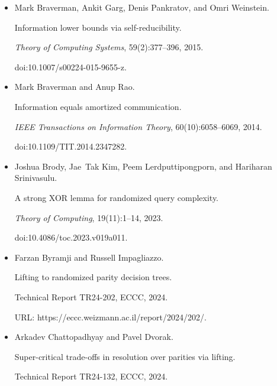 \begin{itemize}
doi:10.4230/LIPIcs.CCC.2024.16.





\item[] 
[14]

Mark Braverman, Ankit Garg, Denis Pankratov, and Omri Weinstein.


Information lower bounds via self-reducibility.


\emph{Theory of Computing Systems}, 59(2):377–396, 2015.


doi:10.1007/s00224-015-9655-z.





\item[] 
[15]

Mark Braverman and Anup Rao.


Information equals amortized communication.


\emph{IEEE Transactions on Information Theory}, 60(10):6058–6069,
2014.


doi:10.1109/TIT.2014.2347282.





\item[] 
[16]

Joshua Brody, Jae Tak Kim, Peem Lerdputtipongporn, and Hariharan Srinivasulu.


A strong XOR lemma for randomized query complexity.


\emph{Theory of Computing}, 19(11):1–14, 2023.


doi:10.4086/toc.2023.v019a011.





\item[] 
[17]

Farzan Byramji and Russell Impagliazzo.


Lifting to randomized parity decision trees.


Technical Report TR24-202, ECCC, 2024.


URL: https://eccc.weizmann.ac.il/report/2024/202/.





\item[] 
[18]

Arkadev Chattopadhyay and Pavel Dvorak.


Super-critical trade-offs in resolution over parities via lifting.


Technical Report TR24-132, ECCC, 2024.



\end{itemize}
